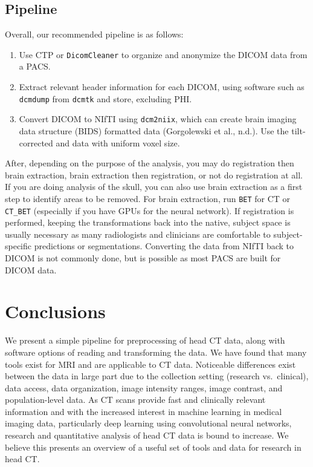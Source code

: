 \documentclass[]{elsarticle} %
\providecommand{\tightlist}{%
  \setlength{\itemsep}{0pt}\setlength{\parskip}{0pt}}
\begin{document}
\hypertarget{pipeline}{%
\subsection{Pipeline}\label{pipeline}}

Overall, our recommended pipeline is as follows:

\begin{enumerate}
\def\labelenumi{\arabic{enumi}.}
\tightlist
\item
  Use CTP or \texttt{DicomCleaner} to organize and anonymize the DICOM data from a PACS.
\item
  Extract relevant header information for each DICOM, using software such as \texttt{dcmdump} from \texttt{dcmtk} and store, excluding PHI.
\item
  Convert DICOM to NIfTI using \texttt{dcm2niix}, which can create brain imaging data structure (BIDS) formatted data (Gorgolewski et al., n.d.). Use the tilt-corrected and data with uniform voxel size.
\end{enumerate}

After, depending on the purpose of the analysis, you may do registration then brain extraction, brain extraction then registration, or not do registration at all. If you are doing analysis of the skull, you can also use brain extraction as a first step to identify areas to be removed. For brain extraction, run \texttt{BET} for CT or \texttt{CT\_BET} (especially if you have GPUs for the neural network). If registration is performed, keeping the transformations back into the native, subject space is usually necessary as many radiologists and clinicians are comfortable to subject-specific predictions or segmentations. Converting the data from NIfTI back to DICOM is not commonly done, but is possible as most PACS are built for DICOM data.

\hypertarget{conclusions}{%
\section{Conclusions}\label{conclusions}}

We present a simple pipeline for preprocessing of head CT data, along with software options of reading and transforming the data. We have found that many tools exist for MRI and are applicable to CT data. Noticeable differences exist between the data in large part due to the collection setting (research vs.~clinical), data access, data organization, image intensity ranges, image contrast, and population-level data. As CT scans provide fast and clinically relevant information and with the increased interest in machine learning in medical imaging data, particularly deep learning using convolutional neural networks, research and quantitative analysis of head CT data is bound to increase. We believe this presents an overview of a useful set of tools and data for research in head CT.
\end{document}
